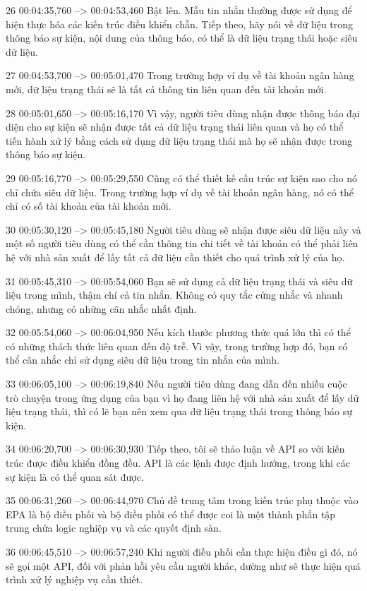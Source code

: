 26
00:04:35,760 --> 00:04:53,460
Bật lên.  Mẫu tin nhắn thường được sử dụng để hiện thực hóa các kiến ​​trúc điều khiển chẵn.  Tiếp theo, hãy nói về dữ liệu trong thông báo sự kiện, nội dung của thông báo, có thể là dữ liệu trạng thái hoặc siêu dữ liệu.

27
00:04:53,700 --> 00:05:01,470
Trong trường hợp ví dụ về tài khoản ngân hàng mới, dữ liệu trạng thái sẽ là tất cả thông tin liên quan đến tài khoản mới.

28
00:05:01,650 --> 00:05:16,170
Vì vậy, người tiêu dùng nhận được thông báo đại diện cho sự kiện sẽ nhận được tất cả dữ liệu trạng thái liên quan và họ có thể tiến hành xử lý bằng cách sử dụng dữ liệu trạng thái mà họ sẽ nhận được trong thông báo sự kiện.

29
00:05:16,770 --> 00:05:29,550
Cũng có thể thiết kế cấu trúc sự kiện sao cho nó chỉ chứa siêu dữ liệu.  Trong trường hợp ví dụ về tài khoản ngân hàng, nó có thể chỉ có số tài khoản của tài khoản mới.

30
00:05:30,120 --> 00:05:45,180
Người tiêu dùng sẽ nhận được siêu dữ liệu này và một số người tiêu dùng có thể cần thông tin chi tiết về tài khoản có thể phải liên hệ với nhà sản xuất để lấy tất cả dữ liệu cần thiết cho quá trình xử lý của họ.

31
00:05:45,310 --> 00:05:54,060
Bạn sẽ sử dụng cả dữ liệu trạng thái và siêu dữ liệu trong mình, thậm chí cả tin nhắn.  Không có quy tắc cứng nhắc và nhanh chóng, nhưng có những cân nhắc nhất định.

32
00:05:54,060 --> 00:06:04,950
Nếu kích thước phương thức quá lớn thì có thể có những thách thức liên quan đến độ trễ.  Vì vậy, trong trường hợp đó, bạn có thể cân nhắc chỉ sử dụng siêu dữ liệu trong tin nhắn của mình.

33
00:06:05,100 --> 00:06:19,840
Nếu người tiêu dùng đang dẫn đến nhiều cuộc trò chuyện trong ứng dụng của bạn vì họ đang liên hệ với nhà sản xuất để lấy dữ liệu trạng thái, thì có lẽ bạn nên xem qua dữ liệu trạng thái trong thông báo sự kiện.

34
00:06:20,700 --> 00:06:30,930
Tiếp theo, tôi sẽ thảo luận về API so với kiến ​​trúc được điều khiển đồng đều.  API là các lệnh được định hướng, trong khi các sự kiện là có thể quan sát được.

35
00:06:31,260 --> 00:06:44,970
Chủ đề trung tâm trong kiến ​​trúc phụ thuộc vào EPA là bộ điều phối và bộ điều phối có thể được coi là một thành phần tập trung chứa logic nghiệp vụ và các quyết định sàn.

36
00:06:45,510 --> 00:06:57,240
Khi người điều phối cần thực hiện điều gì đó, nó sẽ gọi một API, đối với phản hồi yêu cầu người khác, dường như sẽ thực hiện quá trình xử lý nghiệp vụ cần thiết.

